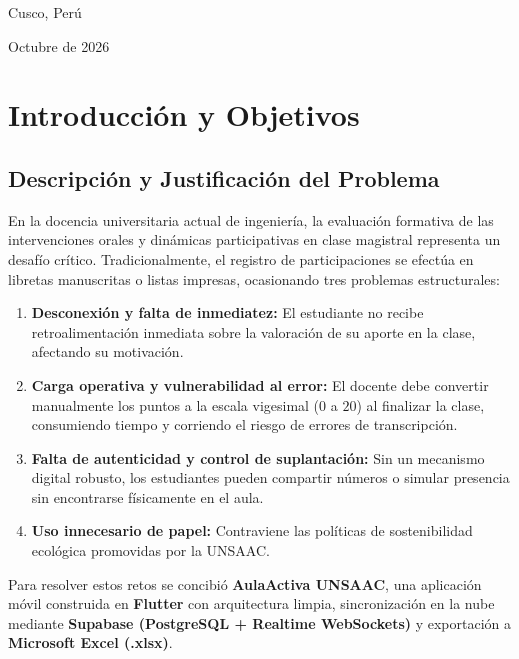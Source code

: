 \documentclass[12pt,a4paper]{article}
\begin{document}
\begin{titlepage}
    \vfill
    {\large Cusco, Perú \par}
    {\large Octubre de 2026 \par}
\end{titlepage}

\tableofcontents
\newpage
\listoffigures
\newpage

\section{Introducción y Objetivos}

\subsection{Descripción y Justificación del Problema}
En la docencia universitaria actual de ingeniería, la evaluación formativa de las intervenciones orales y dinámicas participativas en clase magistral representa un desafío crítico. Tradicionalmente, el registro de participaciones se efectúa en libretas manuscritas o listas impresas, ocasionando tres problemas estructurales:
\begin{enumerate}[noitemsep]
    \item \textbf{Desconexión y falta de inmediatez:} El estudiante no recibe retroalimentación inmediata sobre la valoración de su aporte en la clase, afectando su motivación.
    \item \textbf{Carga operativa y vulnerabilidad al error:} El docente debe convertir manualmente los puntos a la escala vigesimal ($0$ a $20$) al finalizar la clase, consumiendo tiempo y corriendo el riesgo de errores de transcripción.
    \item \textbf{Falta de autenticidad y control de suplantación:} Sin un mecanismo digital robusto, los estudiantes pueden compartir números o simular presencia sin encontrarse físicamente en el aula.
    \item \textbf{Uso innecesario de papel:} Contraviene las políticas de sostenibilidad ecológica promovidas por la UNSAAC.
\end{enumerate}

Para resolver estos retos se concibió \textbf{AulaActiva UNSAAC}, una aplicación móvil construida en \textbf{Flutter} con arquitectura limpia, sincronización en la nube mediante \textbf{Supabase (PostgreSQL + Realtime WebSockets)} y exportación a \textbf{Microsoft Excel (.xlsx)}.
\end{document}
